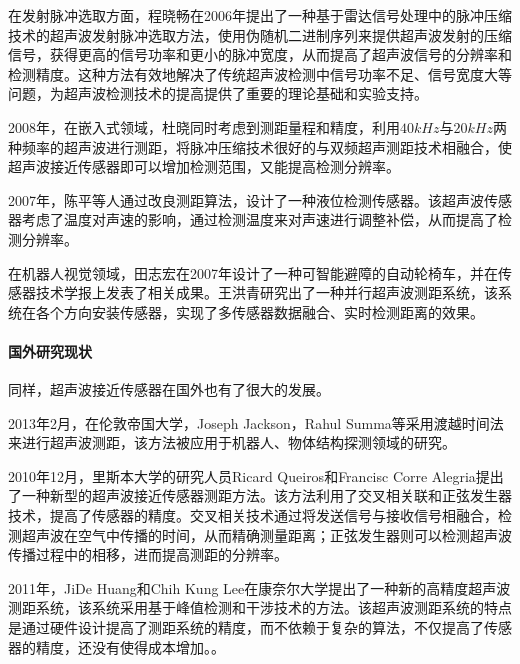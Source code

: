 	在发射脉冲选取方面，程晓畅在2006年提出了一种基于雷达信号处理中的脉冲压缩技术的超声波发射脉冲选取方法，使用伪随机二进制序列来提供超声波发射的压缩信号，获得更高的信号功率和更小的脉冲宽度，从而提高了超声波信号的分辨率和检测精度。这种方法有效地解决了传统超声波检测中信号功率不足、信号宽度大等问题，为超声波检测技术的提高提供了重要的理论基础和实验支持。
	
	2008年，在嵌入式领域，杜晓同时考虑到测距量程和精度，利用$40kHz$与$20kHz$两种频率的超声波进行测距，将脉冲压缩技术很好的与双频超声测距技术相融合，使超声波接近传感器即可以增加检测范围，又能提高检测分辨率。
		
	2007年，陈平等人通过改良测距算法，设计了一种液位检测传感器。该超声波传感器考虑了温度对声速的影响，通过检测温度来对声速进行调整补偿，从而提高了检测分辨率。
	
	在机器人视觉领域，田志宏在2007年设计了一种可智能避障的自动轮椅车，并在传感器技术学报上发表了相关成果。王洪青研究出了一种并行超声波测距系统，该系统在各个方向安装传感器，实现了多传感器数据融合、实时检测距离的效果。
	
    \paragraph{国外研究现状}
	同样，超声波接近传感器在国外也有了很大的发展。
	
	2013年2月，在伦敦帝国大学，Joseph Jackson，Rahul Summa等采用渡越时间法来进行超声波测距，该方法被应用于机器人、物体结构探测领域的研究。
	
	2010年12月，里斯本大学的研究人员Ricard Queiros和Francisc Corre Alegria提出了一种新型的超声波接近传感器测距方法。该方法利用了交叉相关联和正弦发生器技术，提高了传感器的精度。交叉相关技术通过将发送信号与接收信号相融合，检测超声波在空气中传播的时间，从而精确测量距离；正弦发生器则可以检测超声波传播过程中的相移，进而提高测距的分辨率。
	
	2011年，JiDe Huang和Chih Kung Lee在康奈尔大学提出了一种新的高精度超声波测距系统，该系统采用基于峰值检测和干涉技术的方法。该超声波测距系统的特点是通过硬件设计提高了测距系统的精度，而不依赖于复杂的算法，不仅提高了传感器的精度，还没有使得成本增加。。
	
    
